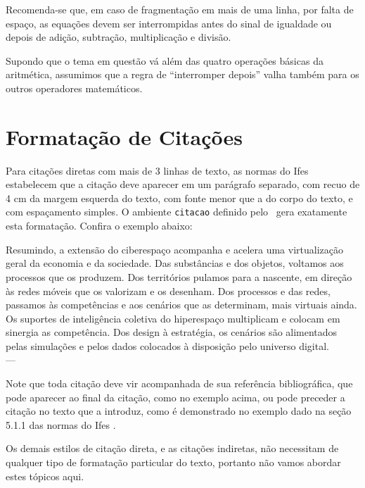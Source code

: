 \documentclass[12pt,times,a4paper,english,brazil,
chapter=TITLE,section=TITLE,subsection=TITLE]{ifes7}
\begin{document}
\begin{citacao}
  Recomenda-se que, em caso de fragmentação em mais de uma linha, por
  falta de espaço, as equações devem ser interrompidas antes do sinal
  de igualdade ou depois de adição, subtração, multiplicação e
  divisão.
\end{citacao}

Supondo que o tema em questão vá além das quatro operações básicas da
aritmética, assumimos que a regra de ``interromper depois'' valha
também para os outros operadores matemáticos.


\section{Formatação de Citações}
\label{sec:format-citac}

Para citações diretas com mais de 3 linhas de texto, as normas do Ifes
estabelecem que a citação deve aparecer em um parágrafo separado, com
recuo de 4 cm da margem esquerda do texto, com fonte menor que a do
corpo do texto, e com espaçamento simples. O ambiente \texttt{citacao}
definido pelo \abnTeX\ gera exatamente esta formatação. Confira o
exemplo abaixo:

\begin{citacao}
  Resumindo, a extensão do ciberespaço acompanha e acelera uma
  virtualização geral da economia e da sociedade. Das substâncias e
  dos objetos, voltamos aos processos que os produzem. Dos territórios
  pulamos para a nascente, em direção às redes móveis que os valorizam
  e os desenham. Dos processos e das redes, passamos às competências e
  aos cenários que as determinam, mais virtuais ainda. Os suportes de
  inteligência coletiva do hiperespaço multiplicam e colocam em
  sinergia as competência. Dos design à estratégia, os cenários são
  alimentados pelas simulações e pelos dados colocados à disposição
  pelo universo digital.\\
  \hspace*{\fill}--- 
\end{citacao}

Note que toda citação deve vir acompanhada de sua referência
bibliográfica, que pode aparecer ao final da citação, como no exemplo
acima, ou pode preceder a citação no texto que a introduz, como é
demonstrado no exemplo dado na seção 5.1.1 das normas do Ifes
\cite[p.~39]{Ifes2014}.

Os demais estilos de citação direta, e as citações indiretas, não
necessitam de qualquer tipo de formatação particular do texto,
portanto não vamos abordar estes tópicos aqui.
\end{document}
